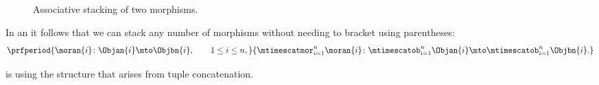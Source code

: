 \begin{figure}[h!]
    \centering
    \caption{Associative stacking of two morphisms.}
    \label{fig:double-stacked-new}
\end{figure}

\begin{remark}
    In an   it follows that we can stack any number of morphisms without needing to bracket using parentheses:
    \begin{equation}
        \prfperiod{
            \moran{i} \colon \Objan{i} \mto \Objbn{i}, \qquad 1 \leq i \leq n,
        }{
            \mtimescatmor_{i=1}^n \moran{i} \colon \mtimescatob_{i=1}^n \Objan{i} \mto \mtimescatob_{i=1}^n \Objbn{i}.
        }
    \end{equation}
\end{remark}
\clearpage
\begin{lemma}
    \label{lem:SetL-is-associative-stacking}
    \SetL is   using the structure that arises from tuple concatenation.
\end{lemma}
